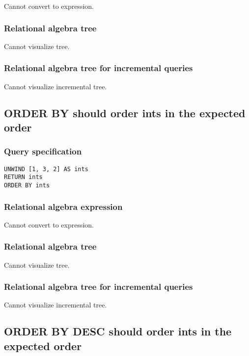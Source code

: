 Cannot convert to expression.

\subsubsection*{Relational algebra tree}

Cannot visualize tree.

\subsubsection*{Relational algebra tree for incremental queries}

Cannot visualize incremental tree.

\subsection{ORDER BY should order ints in the expected order}

\subsubsection*{Query specification}

\begin{lstlisting}
UNWIND [1, 3, 2] AS ints
RETURN ints
ORDER BY ints
\end{lstlisting}

\subsubsection*{Relational algebra expression}

Cannot convert to expression.

\subsubsection*{Relational algebra tree}

Cannot visualize tree.

\subsubsection*{Relational algebra tree for incremental queries}

Cannot visualize incremental tree.

\subsection{ORDER BY DESC should order ints in the expected order}

